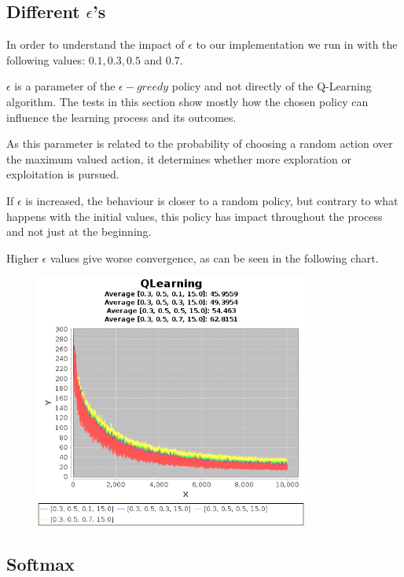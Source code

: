 \documentclass{article}
\begin{document}
\subsection{Different $\epsilon$'s}
\label{ep}
In order to understand the impact of $\epsilon$ to our implementation we run
in with the following values:
$0.1, 0.3, 0.5$ and $0.7$.

$\epsilon$ is a parameter of the $\epsilon-greedy$ policy and not directly of the Q-Learning algorithm. The tests in this section show mostly how the chosen policy can
influence the learning process and its outcomes. 

As this parameter is related to the probability of choosing a random action over
the maximum valued action, it determines whether more exploration or exploitation is pursued.

If $\epsilon$ is increased, the behaviour is closer to a random
policy, but contrary to what happens with the initial values, this policy has
impact throughout the process and not just at the beginning.

Higher $\epsilon$ values give worse convergence, as can be seen in the following
chart.

\begin{figure}[h]
\centering
\includegraphics[width=0.8\textwidth]{res/alpha_03_gama_05_epsilon_01_to_07_IV_15.png}
\end{figure}

\subsection{Softmax}
\label{softmax}
\end{document}
